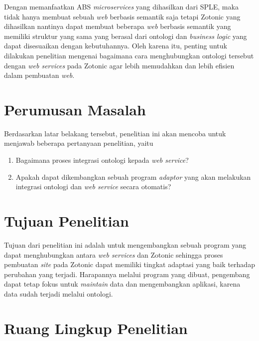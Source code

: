 Dengan memanfaatkan ABS \textit{microservices} yang dihasilkan dari SPLE, maka tidak hanya membuat sebuah \textit{web} berbasis semantik saja tetapi Zotonic yang dihasilkan nantinya dapat membuat beberapa \textit{web} berbasis semantik yang memiliki struktur yang sama yang berasal dari ontologi dan \textit{business logic} yang dapat disesuaikan dengan kebutuhannya. Oleh karena itu, penting untuk dilakukan penelitian mengenai bagaimana cara menghubungkan ontologi tersebut dengan \textit{web services} pada Zotonic agar lebih memudahkan dan lebih efisien dalam pembuatan \textit{web}.
\section{Perumusan Masalah}
Berdasarkan latar belakang tersebut, penelitian ini akan mencoba untuk menjawab beberapa pertanyaan penelitian, yaitu
\begin{enumerate}
\item Bagaimana proses integrasi ontologi kepada \textit{web service}?
\item Apakah dapat dikembangkan sebuah program \textit{adaptor} yang akan melakukan integrasi ontologi dan \textit{web service} secara otomatis?
\end{enumerate}
\section{Tujuan Penelitian}
Tujuan dari penelitian ini adalah untuk mengembangkan sebuah program yang dapat menghubungkan antara \textit{web services} dan Zotonic sehingga proses pembuatan \textit{site} pada Zotonic dapat memiliki tingkat adaptasi yang baik terhadap perubahan yang terjadi. Harapannya melalui program yang dibuat, pengembang dapat tetap fokus untuk \textit{maintain} data dan mengembangkan aplikasi, karena data sudah terjadi melalui ontologi.

\section{Ruang Lingkup Penelitian}

